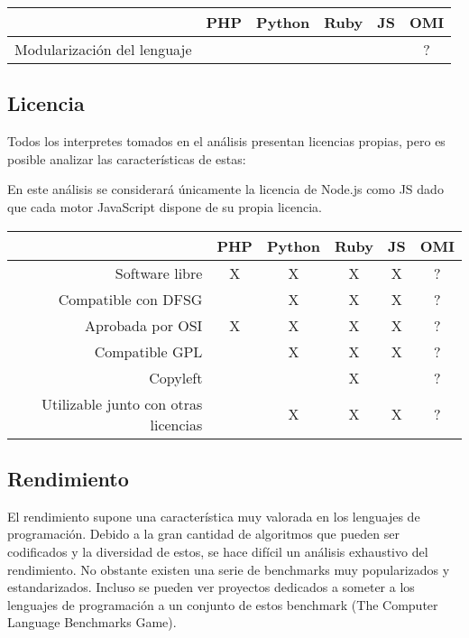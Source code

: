 \FloatBarrier
\begin{table}[h]
\begin{center}
\begin{tabular}{|r|c|c|c|c|c|} \hline
 & PHP  & Python & Ruby & JS & OMI\\ \hline
Modularización del lenguaje &  &  &  &   & ? \\ \hline
\end{tabular}
\end{center}
\end{table}
\FloatBarrier


\subsection{Licencia}
Todos los interpretes tomados en el análisis presentan licencias propias, pero es
posible analizar las características de estas:

En este análisis se considerará únicamente la licencia de Node.js como JS
dado que cada motor JavaScript dispone de su propia licencia.

\FloatBarrier
\begin{table}[h]
\begin{center}
\begin{tabular}{|r|c|c|c|c|c|} \hline
 & PHP  & Python & Ruby & JS & OMI\\ \hline
Software libre  & X & X & X & X  & ? \\ \hline
Compatible con DFSG &  & X & X & X  & ? \\ \hline
Aprobada por OSI & X & X & X &  X & ? \\ \hline
Compatible GPL &  & X & X  & X  & ?  \\ \hline
Copyleft &  & & X &   & ? \\ \hline
Utilizable junto con otras licencias &  & X & X &  X & ? \\ \hline
\end{tabular}
\end{center}
\end{table}
\FloatBarrier

\subsection{Rendimiento}
El rendimiento supone una característica muy valorada en los lenguajes de programación. 
Debido a la gran cantidad de algoritmos que pueden ser codificados y la diversidad de estos, se hace difícil un análisis exhaustivo del rendimiento.
No obstante existen una serie de benchmarks muy popularizados y estandarizados. Incluso se pueden ver proyectos dedicados a someter 
a los lenguajes de programación a un conjunto de estos benchmark (The Computer Language Benchmarks Game).

